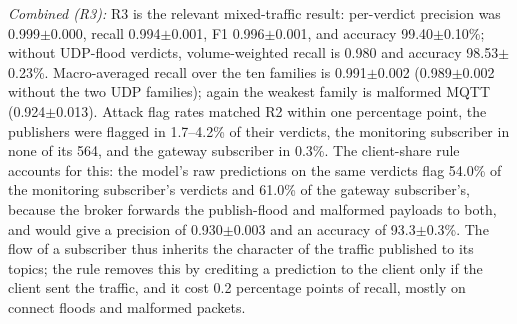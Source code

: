 \documentclass[journal]{IEEEtran}
\begin{document}
\textit{Combined (R3):} R3 is the relevant mixed-traffic result: per-verdict precision was 0.999$\pm$0.000, recall 0.994$\pm$0.001, F1 0.996$\pm$0.001, and accuracy 99.40$\pm$0.10\%; without UDP-flood verdicts, volume-weighted recall is 0.980 and accuracy 98.53$\pm$0.23\%. Macro-averaged recall over the ten families is 0.991$\pm$0.002 (0.989$\pm$0.002 without the two UDP families); again the weakest family is malformed MQTT (0.924$\pm$0.013). Attack flag rates matched R2 within one percentage point, the publishers were flagged in 1.7--4.2\% of their verdicts, the monitoring subscriber in none of its 564, and the gateway subscriber in 0.3\%. The client-share rule accounts for this: the model's raw predictions on the same verdicts flag 54.0\% of the monitoring subscriber's verdicts and 61.0\% of the gateway subscriber's, because the broker forwards the publish-flood and malformed payloads to both, and would give a precision of 0.930$\pm$0.003 and an accuracy of 93.3$\pm$0.3\%. The flow of a subscriber thus inherits the character of the traffic published to its topics; the rule removes this by crediting a prediction to the client only if the client sent the traffic, and it cost 0.2 percentage points of recall, mostly on connect floods and malformed packets.
\end{document}
